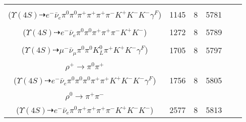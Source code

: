\documentclass[landscape]{article}
\newcounter{rownumbers}
\newcommand\rn{\stepcounter{rownumbers}\arabic{rownumbers}}
\newcommand{\EOL}{\\} %
\newcommand{\topoTags}[1]{#1} %
\begin{document}
\begin{longtable}{clcccc}
\rn & \makecell[l]{ $ 
\Upsilon(4S) \rightarrow B^{0} \bar{B}^{0} ,
B^{0} \rightarrow \pi^{0} K^{+} K^{-} ,
\bar{B}^{0} \rightarrow e^{-} \bar{\nu}_{e} D^{*+} \gamma^{F} ,
D^{*+} \rightarrow \pi^{+} D^{0} ,
D^{0} \rightarrow \pi^{0} \pi^{+} \pi^{-} \bar{K}^{*} ,
\bar{K}^{*} \rightarrow \pi^{+} K^{-} 
$ \\ ($
\Upsilon(4S) \dashrightarrow e^{-} \bar{\nu}_{e} \pi^{0} \pi^{0} \pi^{+} \pi^{+} \pi^{+} \pi^{-} K^{+} K^{-} K^{-} \gamma^{F} 
$) } & \topoTags{1145 & }8 & 5781 \EOL

\rn & \makecell[l]{ $ 
\Upsilon(4S) \rightarrow B^{0} \bar{B}^{0} ,
B^{0} \rightarrow \pi^{0} K^{+} K^{-} ,
\bar{B}^{0} \rightarrow e^{-} \bar{\nu}_{e} D^{*+} ,
D^{*+} \rightarrow \pi^{+} D^{0} ,
D^{0} \rightarrow \pi^{0} K_{S}^{0} ,
K_{S}^{0} \rightarrow \pi^{+} \pi^{-} 
$ \\ ($
\Upsilon(4S) \dashrightarrow e^{-} \bar{\nu}_{e} \pi^{0} \pi^{0} \pi^{+} \pi^{+} \pi^{-} K^{+} K^{-} 
$) } & \topoTags{1272 & }8 & 5789 \EOL

\rn & \makecell[l]{ $ 
\Upsilon(4S) \rightarrow B^{0} \bar{B}^{0} ,
B^{0} \rightarrow \pi^{0} K^{+} K^{-} \gamma^{F} ,
\bar{B}^{0} \rightarrow \mu^{-} \bar{\nu}_{\mu} D^{+} ,
D^{+} \rightarrow \pi^{0} K_{L}^{0} \pi^{+} 
$ \\ ($
\Upsilon(4S) \dashrightarrow \mu^{-} \bar{\nu}_{\mu} \pi^{0} \pi^{0} K_{L}^{0} \pi^{+} K^{+} K^{-} \gamma^{F} 
$) } & \topoTags{1705 & }8 & 5797 \EOL

\rn & \makecell[l]{ $ 
\Upsilon(4S) \rightarrow B^{0} \bar{B}^{0} ,
B^{0} \rightarrow \pi^{0} K^{+} K^{-} ,
\bar{B}^{0} \rightarrow e^{-} \bar{\nu}_{e} D^{*+} \gamma^{F} ,
D^{*+} \rightarrow \pi^{+} D^{0} ,
D^{0} \rightarrow K^{-} a_{1}^{+} ,
a_{1}^{+} \rightarrow \pi^{0} \rho^{+} ,
$ \\ $
\rho^{+} \rightarrow \pi^{0} \pi^{+} 
$ \\ ($
\Upsilon(4S) \dashrightarrow e^{-} \bar{\nu}_{e} \pi^{0} \pi^{0} \pi^{0} \pi^{+} \pi^{+} K^{+} K^{-} K^{-} \gamma^{F} 
$) } & \topoTags{1756 & }8 & 5805 \EOL

\rn & \makecell[l]{ $ 
\Upsilon(4S) \rightarrow B^{0} \bar{B}^{0} ,
B^{0} \rightarrow \pi^{0} K^{+} K^{-} ,
\bar{B}^{0} \rightarrow e^{-} \bar{\nu}_{e} D^{*+} ,
D^{*+} \rightarrow \pi^{+} D^{0} ,
D^{0} \rightarrow K^{-} a_{1}^{+} ,
a_{1}^{+} \rightarrow \rho^{0} \pi^{+} ,
$ \\ $
\rho^{0} \rightarrow \pi^{+} \pi^{-} 
$ \\ ($
\Upsilon(4S) \dashrightarrow e^{-} \bar{\nu}_{e} \pi^{0} \pi^{+} \pi^{+} \pi^{+} \pi^{-} K^{+} K^{-} K^{-} 
$) } & \topoTags{2577 & }8 & 5813 \EOL


\end{longtable}
\end{document}
